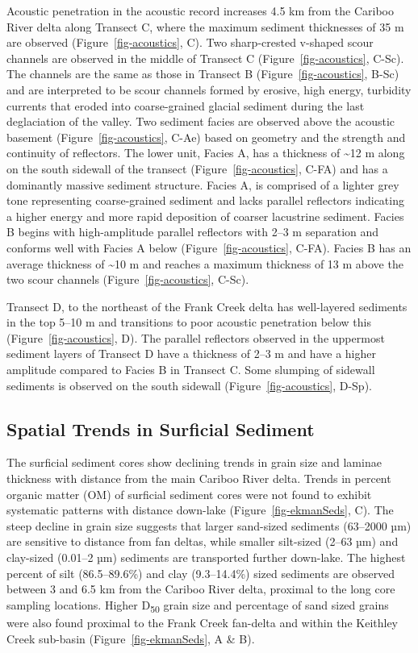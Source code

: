\documentclass[
  letterpaper,
  DIV=11,
  numbers=noendperiod]{scrartcl}
\begin{document}
Acoustic penetration in the acoustic record increases 4.5 km from the
Cariboo River delta along Transect C, where the maximum sediment
thicknesses of 35 m are observed (Figure~\ref{fig-acoustics}, C). Two
sharp-crested v-shaped scour channels are observed in the middle of
Transect C (Figure~\ref{fig-acoustics}, C-Sc). The channels are the same
as those in Transect B (Figure~\ref{fig-acoustics}, B-Sc) and are
interpreted to be scour channels formed by erosive, high energy,
turbidity currents that eroded into coarse-grained glacial sediment
during the last deglaciation of the valley. Two sediment facies are
observed above the acoustic basement (Figure~\ref{fig-acoustics}, C-Ae)
based on geometry and the strength and continuity of reflectors. The
lower unit, Facies A, has a thickness of \textasciitilde12 m along on
the south sidewall of the transect (Figure~\ref{fig-acoustics}, C-FA)
and has a dominantly massive sediment structure. Facies A, is comprised
of a lighter grey tone representing coarse-grained sediment and lacks
parallel reflectors indicating a higher energy and more rapid deposition
of coarser lacustrine sediment. Facies B begins with high-amplitude
parallel reflectors with 2--3 m separation and conforms well with Facies
A below (Figure~\ref{fig-acoustics}, C-FA). Facies B has an average
thickness of \textasciitilde10 m and reaches a maximum thickness of 13 m
above the two scour channels (Figure~\ref{fig-acoustics}, C-Sc).

Transect D, to the northeast of the Frank Creek delta has well-layered
sediments in the top 5--10 m and transitions to poor acoustic
penetration below this (Figure~\ref{fig-acoustics}, D). The parallel
reflectors observed in the uppermost sediment layers of Transect D have
a thickness of 2--3 m and have a higher amplitude compared to Facies B
in Transect C. Some slumping of sidewall sediments is observed on the
south sidewall (Figure~\ref{fig-acoustics}, D-Sp).

\hypertarget{spatial}{%
\subsection{Spatial Trends in Surficial Sediment}\label{spatial}}

The surficial sediment cores show declining trends in grain size and
laminae thickness with distance from the main Cariboo River delta.
Trends in percent organic matter (OM) of surficial sediment cores were
not found to exhibit systematic patterns with distance down-lake
(Figure~\ref{fig-ekmanSeds}, C). The steep decline in grain size
suggests that larger sand-sized sediments (63--2000 µm) are sensitive to
distance from fan deltas, while smaller silt-sized (2--63 µm) and
clay-sized (0.01--2 µm) sediments are transported further down-lake. The
highest percent of silt (86.5--89.6\%) and clay (9.3--14.4\%) sized
sediments are observed between 3 and 6.5 km from the Cariboo River
delta, proximal to the long core sampling locations. Higher
D\textsubscript{50} grain size and percentage of sand sized grains were
also found proximal to the Frank Creek fan-delta and within the Keithley
Creek sub-basin (Figure~\ref{fig-ekmanSeds}, A \& B).
\end{document}
